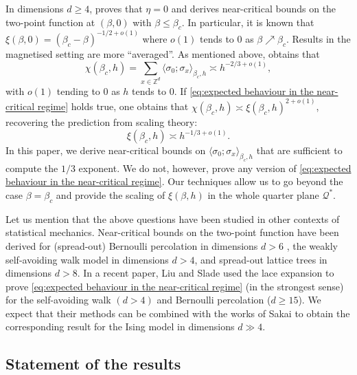 \documentclass[10pt,a4paper]{amsart}
\numberwithin{equation}{section}
\begin{document}
 In dimensions $d\geq 4$, \cite{DuminilPanis2024newLB} proves that $\eta=0$ and derives near-critical bounds on the two-point function at $(\beta,0)$ with $\beta\leq \beta_c$. In particular, it is known that $\xi(\beta,0)=(\beta_c-\beta)^{-1/2+o(1)}$ where $o(1)$ tends to $0$ as $\beta\nearrow \beta_c$. Results in the magnetised setting are more ``averaged''. As mentioned above, \cite{AizenmanFernandezCriticalBehaviorMagnetization1986} obtains that
 \begin{equation}
 	\chi(\beta_c,h)=\sum_{x\in \mathbb Z^d}\langle \sigma_0;\sigma_x\rangle_{\beta_c,h}\asymp h^{-2/3+o(1)},
 \end{equation}
 with $o(1)$ tending to $0$ as $h$ tends to $0$.
 If \eqref{eq:expected behaviour in the near-critical regime} holds true, one obtains that $\chi(\beta_c,h)\asymp \xi(\beta_c,h)^{2+o(1)}$, recovering the prediction from scaling theory: 
 \begin{equation}
 \xi(\beta_c,h)\asymp h^{-1/3+o(1)}.
 \end{equation}
  In this paper, we derive near-critical bounds on $\langle\sigma_0;\sigma_x\rangle_{\beta_c,h}$ that are sufficient to compute the $1/3$ exponent. We do not, however, prove any version of \eqref{eq:expected behaviour in the near-critical regime}. Our techniques allow us to go beyond the case $\beta=\beta_c$ and provide the scaling of $\xi(\beta,h)$ in the whole quarter plane $\mathcal Q^*$.
 
Let us mention that the above questions have been studied in other contexts of statistical mechanics. Near-critical bounds on the two-point function have been derived for (spread-out) Bernoulli percolation in dimensions $d>6$ \cite{HutchcroftMichtaSladePercolationTorusPlateau2023,DumPan24Perco,duminil2026random,panis2026reversing}, the weakly self-avoiding walk model \cite{Liu2023Plateau,Slade2023Plateau,DumPan24WSAW} in dimensions $d>4$, and spread-out lattice trees \cite{liu2025near} in dimensions $d>8$. In a recent paper, Liu and Slade \cite{liu2026crossover} used the lace expansion to prove \eqref{eq:expected behaviour in the near-critical regime} (in the strongest sense) for the self-avoiding walk $(d>4)$ and Bernoulli percolation ($d\geq 15$). We expect that their methods can be combined with the works of Sakai \cite{Sakai2007LaceExpIsing,Sakai2022correctboundsIsing} to obtain the corresponding result for the Ising model in dimensions $d\gg 4$.

\subsection{Statement of the results}
\end{document}
